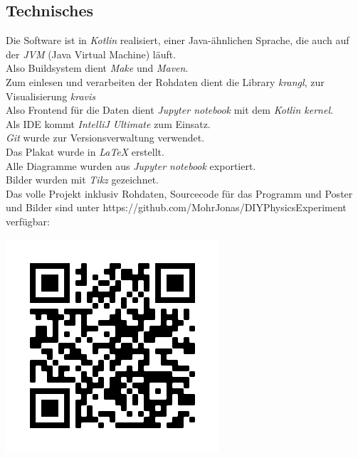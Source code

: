 \documentclass{article}
\begin{document}
\begin{multicols*}{3}
   \section*{Technisches}
   Die Software ist in \emph{Kotlin} realisiert, einer Java-ähnlichen Sprache, die auch auf der \emph{JVM} (Java Virtual Machine) läuft.\\
   Also Buildsystem dient \emph{Make} und \emph{Maven}. \\
   Zum einlesen und verarbeiten der Rohdaten dient die Library \emph{krangl}, zur Visualisierung \emph{kravis}\\
   Also Frontend für die Daten dient \emph{Jupyter notebook} mit dem \emph{Kotlin kernel}. \\
   Als IDE kommt \emph{IntelliJ Ultimate} zum Einsatz.\\
   \emph{Git} wurde zur Versionsverwaltung verwendet.\\
   Das Plakat wurde in \emph{\LaTeX} erstellt.\\
   Alle Diagramme wurden aus \emph{Jupyter notebook} exportiert.\\
   Bilder wurden mit \emph{Tikz} gezeichnet.\\
   Das volle Projekt inklusiv Rohdaten, Sourcecode für das Programm und Poster und Bilder sind unter https://github.com/MohrJonas/DIYPhysicsExperiment verfügbar:\\
   \vspace*{3px}
   \begin{center}
      \captionsetup{justification=centering}
      \includegraphics[scale=0.3]{../images/qr_code}
      \label{fig:qr_code}
   \end{center}
\end{multicols*}
\end{document}
